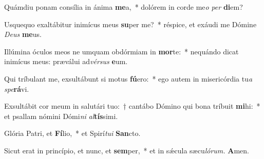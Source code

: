 \item Quámdiu ponam consília in ánima \textbf{me}a,~* dolórem in corde me\tinyhspace\textit{o} \textit{per} \textbf{di}em?
\item Usquequo exaltábitur inimícus meus \textbf{su}per me?~* réspice, et exáudi me Dómine \textit{Deus} \textbf{me}us.
\item Illúmina óculos meos ne umquam obdórmiam in \textbf{mor}te:~* nequándo dicat inimícus meus: præválui ad\textit{vérsus} \textbf{e}um.
\item Qui tríbulant me, exsultábunt si motus \textbf{fú}ero:~* ego autem in misericórdia tu\tinyhspace\textit{a} \textit{spe}\textbf{rá}vi.
\item Exsultábit cor meum in salutári tuo:~† cantábo Dómino qui bona tríbuit \textbf{mi}hi:~* et psallam nómini Dómi\textit{ni} \textit{al}\textbf{tís}simi.
\item Glória Patri, et \textbf{Fí}lio,~* et Spirí\tinyhspace\textit{tui} \textbf{San}cto.
\item Sicut erat in princípio, et nunc, et \textbf{sem}per,~* et in sǽcula sæcu\tinyhspace\textit{lórum.} \textbf{A}men.